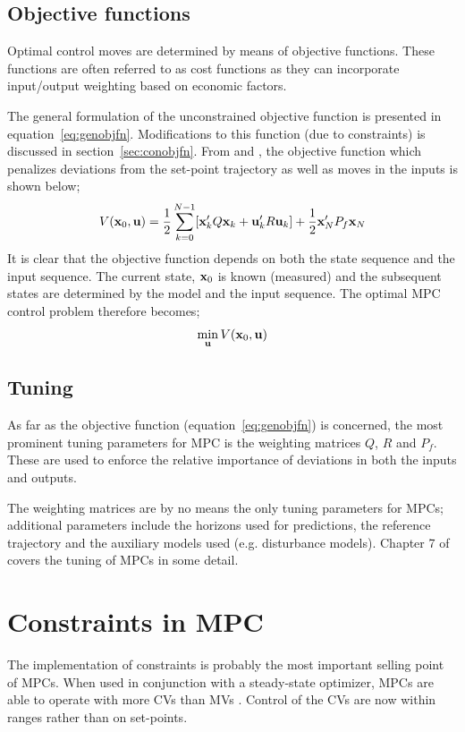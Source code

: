 \subsection{Objective functions}
Optimal control moves are determined by means of objective functions.
These functions are often referred to as cost functions \citep[41]{maciejowskimpc} as they can incorporate input/output weighting based on economic factors.

The general formulation of the unconstrained objective function is presented in equation~\ref{eq:genobjfn}. 
Modifications to this function (due to constraints) is discussed in section~\ref{sec:conobjfn}. 
From \citet[17]{rawlings} and \citet[41]{maciejowskimpc}, the objective function which penalizes deviations from the set-point trajectory as well as moves in the inputs is shown below;
\begin{equation}
  \label{eq:genobjfn}
  V({\bf {x}}_0,{\bf {u}})=\frac{1}{2}\sum^{N-1}_{k=0}[{\bf {x}}_k'Q{\bf {x}}_k + {\bf {u}}_k'R{\bf {u}}_k]
  + \frac{1}{2}{\bf {x}}_N'P_f{\bf {x}}_N
\end{equation}
It is clear that the objective function depends on both the state sequence and the input sequence. 
The current state, ${\bf {x}}_0$ is known (measured) and the subsequent states are determined by the model and the input sequence. 
The optimal MPC control problem therefore becomes;
\begin{equation}
  \label{eq:opctrlprob}
  \min_{{\bf {u}}} V({\bf {x}}_0,{\bf u})
\end{equation}

\subsection{Tuning}
As far as the objective function (equation~\ref{eq:genobjfn}) is concerned, the most prominent tuning parameters for MPC is the weighting matrices $Q$, $R$ and $P_f$. 
These are used to enforce the relative importance of deviations in both the inputs and outputs.

The weighting matrices are by no means the only tuning parameters for MPCs; additional parameters include the horizons used for predictions, the reference trajectory and the auxiliary models used (e.g. disturbance models). 
Chapter 7 of \citet{maciejowskimpc} covers the tuning of MPCs in some detail.

\section{Constraints in MPC}
The implementation of constraints is probably the most important selling point of MPCs.
When used in conjunction with a steady-state optimizer, MPCs are able to operate with more CVs than MVs \citet{vinsonphd}. 
Control of the CVs are now within ranges rather than on set-points.

